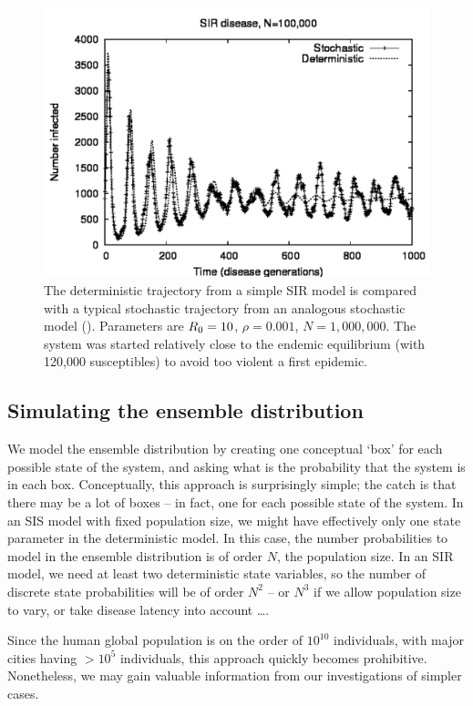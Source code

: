 \documentclass{amsproc}
\theoremstyle{definition}
\theoremstyle{remark}
\numberwithin{equation}{section}
\begin{document}
\begin{figure}
\includegraphics[width=\figwidth]{inputs/dscomp.pdf}
\caption[Demographic spread]{
%
	The deterministic trajectory from a simple SIR model  is compared with a typical stochastic trajectory from an analogous stochastic model ().  Parameters are $R_0=10$, $\rho=0.001$, $N=1,000,000$.  The system was started relatively close to the endemic equilibrium (with 120,000 susceptibles) to avoid too violent a first epidemic.
%
}
\end{figure}

\subsection{Simulating the ensemble distribution}

We model the ensemble distribution by creating one conceptual `box' for each possible state of the system, and asking what is the probability that the system is in each box. 
Conceptually, this approach is surprisingly simple; the catch is that there may be a lot of boxes -- in fact, one for each possible state of the system.
In an SIS model with fixed population size, we might have effectively only one state parameter in the deterministic model. 
In this case, the number probabilities to model in the ensemble distribution is of order $N$, the population size.
In an SIR model, we need at least two deterministic state variables, so the number of discrete state probabilities will be of order $N^2$ -- or $N^3$ if we allow population size to vary, or take disease latency into account \ldots.  

Since the human global population is on the order of $10^{10}$ individuals, with major cities having $>10^5$ individuals, this approach quickly becomes prohibitive.  Nonetheless, we may gain valuable information from our investigations of simpler cases.
\end{document}
